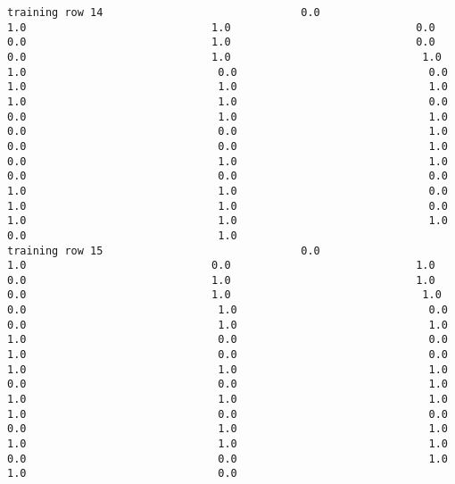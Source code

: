 \documentclass[11pt]{article}
\begin{document}
\begin{verbatim}
training row 14                               0.0                             1.0                             1.0                             0.0                             0.0                             1.0                             0.0                             0.0                             1.0                              1.0                              1.0                              0.0                              0.0                              1.0                              1.0                              1.0                              1.0                              1.0                              0.0                              0.0                              1.0                              1.0                              0.0                              0.0                              1.0                              0.0                              0.0                              1.0                              0.0                              1.0                              1.0                              0.0                              0.0                              0.0                              1.0                              1.0                              0.0                              1.0                              1.0                              0.0                              1.0                              1.0                              1.0                              0.0                              1.0
training row 15                               0.0                             1.0                             0.0                             1.0                             0.0                             1.0                             1.0                             0.0                             1.0                              1.0                              0.0                              1.0                              0.0                              0.0                              1.0                              1.0                              1.0                              0.0                              0.0                              1.0                              0.0                              0.0                              1.0                              1.0                              1.0                              0.0                              0.0                              1.0                              1.0                              1.0                              1.0                              1.0                              0.0                              0.0                              0.0                              1.0                              1.0                              1.0                              1.0                              1.0                              0.0                              0.0                              1.0                              1.0                              0.0

\end{verbatim}
\end{document}
